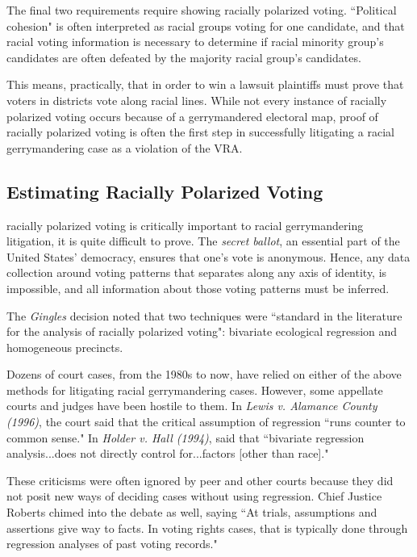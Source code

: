 The final two requirements require showing racially polarized voting. ``Political cohesion" is often interpreted as racial groups voting for one candidate, and that racial voting information is necessary to determine if racial minority group's candidates are often defeated by the majority racial group's candidates.

This means, practically, that in order to win a lawsuit plaintiffs must prove that voters in districts vote along racial lines. While not every instance of racially polarized voting occurs because of a gerrymandered electoral map, proof of racially polarized voting is often the first step in successfully litigating a racial gerrymandering case as a violation of the VRA.

\subsection{Estimating Racially Polarized Voting}

 racially polarized voting is critically important to racial gerrymandering litigation, it is quite difficult to prove. The \textit{secret ballot}, an essential part of the United States' democracy, ensures that one's vote is anonymous. Hence, any data collection around voting patterns that separates along any axis of identity, is impossible, and all information about those voting patterns must be inferred.

The \textit{Gingles} decision noted that two techniques were ``standard in the literature for the analysis of racially polarized voting"\cite{thornburg}: bivariate ecological regression and homogeneous precincts.

Dozens of court cases, from the 1980s to now, have relied on either of the above methods for litigating racial gerrymandering cases.\cite{greiner} However, some appellate courts and judges have been hostile to them. In \textit{Lewis v. Alamance County (1996)},\cite{Lewis_Alamance} the court said that the critical assumption of regression ``runs counter to common sense." In \textit{Holder v. Hall (1994)},\cite{Holder_Hall} said that ``bivariate regression analysis...does not directly control for...factors [other than race]."

These criticisms were often ignored by peer and other courts because they did not posit new ways of deciding cases without using regression. Chief Justice Roberts chimed into the debate as well, saying ``At trials, assumptions and assertions give way to facts. In voting rights cases, that is typically done through regression analyses of past voting records."\cite{LULAC}

